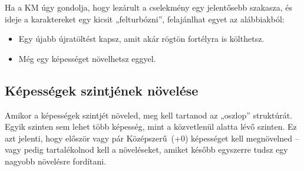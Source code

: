 Ha a KM úgy gondolja, hogy lezárult a cselekmény egy jelentősebb szakasza, és ideje a karaktereket egy kicsit „felturbózni”, felajánlhat egyet az alábbiakból:

\begin{itemize}
    \item Egy újabb újratöltést kapsz, amit akár rögtön fortélyra is költhetsz.
    \item Még egy képességet növelhetsz eggyel.
\end{itemize}

\newpage

\subsection{Képességek szintjének növelése}

Amikor a képességek szintjét növeled, meg kell tartanod az „oszlop” struktúrát. Egyik szinten sem lehet több képesség, mint a közvetlenül alatta lévő szinten. Ez azt jelenti, hogy először vagy pár Középszerű~(+0) képességet kell megnövelned – vagy pedig tartalékolnod kell a növeléseket, amiket később egyszerre tudsz egy nagyobb növelésre fordítani.


\begin{center}
\end{center}

